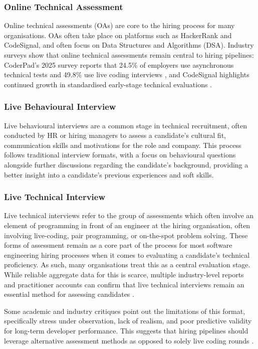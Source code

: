 \subsubsection{Online Technical Assessment}
Online technical assessments (OAs) are core to the hiring process for many organisations. 
OAs often take place on platforms such as HackerRank and CodeSignal, and often focus on Data Structures and Algorithms (DSA). 
Industry surveys show that online technical assessments remain central to hiring pipelines: CoderPad's 2025 survey reports 
that 24.5\% of employers use asynchronous technical tests and 49.8\% use live coding interviews \cite{coderpad2025techhiring}, 
and CodeSignal highlights continued growth in standardised early-stage technical evaluations \cite{codesignal2023}.

\subsubsection{Live Behavioural Interview}
Live behavioural interviews are a common stage in technical recruitment, often conducted by HR or hiring managers to assess a candidate's cultural fit, communication skills and motivations for the role and company.
This process follows traditional interview formats, with a focus on behavioural questions alongside further discussions regarding the candidate's background, providing a better insight into a candidate's previous experiences and soft skills.

\subsubsection{Live Technical Interview}
Live technical interviews refer to the group of assessments which often involve an element of programming in front of an engineer at the hiring organisation, often involving live-coding, pair programming, or on-the-spot problem solving. 
These forms of assessment remain as a core part of the process for most software engineering hiring processes when it comes to evaluating a candidate's technical proficiency. 
As such, many organisations treat this as a central evaluation stage. 
While reliable aggregate data for this is scarce, multiple industry-level reports and practitioner accounts can confirm that live technical interviews remain an essential method for assessing candidates \cite{karat2020}. 

Some academic and industry critiques point out the limitations of this format, specifically stress under observation, lack of realism, and poor predictive validity for long-term developer performance. 
This suggests that hiring pipelines should leverage alternative assessment methods as opposed to solely live coding rounds \cite{behroozi2019hiring}.

